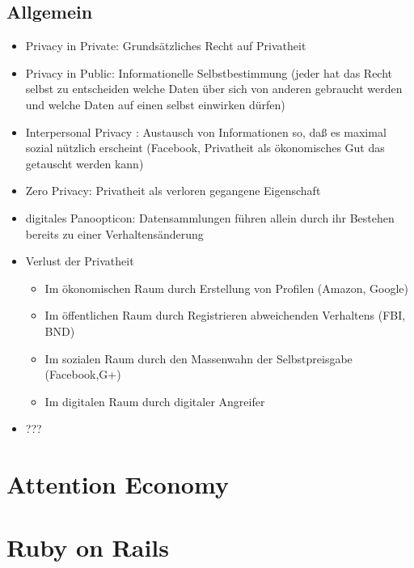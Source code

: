 \documentclass{article} %
\begin{document}
	\subsection{Allgemein}
	\begin{itemize}
		\item \glqq Privacy in Private\grqq: Grundsätzliches Recht auf Privatheit
		\item \glqq Privacy in Public\grqq: Informationelle Selbstbestimmung (jeder hat das Recht selbst zu entscheiden welche Daten über sich von anderen gebraucht werden und welche Daten auf einen selbst einwirken dürfen)
		\item \glqq Interpersonal Privacy \grqq: Austausch von Informationen so, daß es maximal sozial nützlich
		erscheint (Facebook, Privatheit als ökonomisches Gut das getauscht werden kann)
		\item \glqq Zero Privacy\grqq: Privatheit als verloren gegangene Eigenschaft
		\item digitales Panoopticon: Datensammlungen führen allein durch ihr Bestehen bereits zu einer Verhaltensänderung
		\item Verlust der Privatheit
		\begin{itemize}
			\item Im ökonomischen Raum durch Erstellung von Profilen (Amazon, Google)
			\item Im öffentlichen Raum durch Registrieren abweichenden Verhaltens (FBI, BND)
			\item Im sozialen Raum durch den Massenwahn der Selbstpreisgabe (Facebook,G+)
			\item Im digitalen Raum durch digitaler Angreifer
		\end{itemize}
		\item ???
	\end{itemize}
\section{Attention Economy}
\section{Ruby on Rails}
\end{document}
